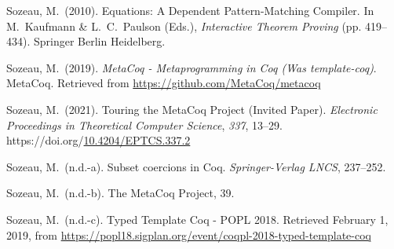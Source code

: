 \documentclass[12pt,twoside]{article}
\begin{document}
{\begin{thebibliography}{1079}
\mdbibitemlabel{}Sozeau, M.~(2010). Equations: A Dependent Pattern-Matching Compiler. In M.~Kaufmann \& L.~C.~Paulson (Eds.), \emph{Interactive Theorem Proving} (pp. 419–434). Springer Berlin Heidelberg.%

\mdbibitemlabel{}Sozeau, M.~(2019). \emph{MetaCoq - Metaprogramming in Coq (Was template-coq)}. MetaCoq. Retrieved from \href{https://github.com/MetaCoq/metacoq}{{\ttfamily https://\hspace{0pt}github.\hspace{0pt}com/\hspace{0pt}MetaCoq/\hspace{0pt}metacoq}}%

\mdbibitemlabel{}Sozeau, M.~(2021). Touring the MetaCoq Project (Invited Paper). \emph{Electronic Proceedings in Theoretical Computer Science}, \emph{337}, 13–29. https://doi.org/\href{https://dx.doi.org/10.4204/EPTCS.337.2}{10.4204/EPTCS.337.2}%

\mdbibitemlabel{}Sozeau, M.~(n.d.-a). Subset coercions in Coq. \emph{Springer-Verlag LNCS}, 237–252.%

\mdbibitemlabel{}Sozeau, M.~(n.d.-b). The MetaCoq Project, 39.%

\mdbibitemlabel{}Sozeau, M.~(n.d.-c). Typed Template Coq - POPL 2018. Retrieved February 1, 2019, from \href{https://popl18.sigplan.org/event/coqpl-2018-typed-template-coq}{{\ttfamily https://\hspace{0pt}popl18.\hspace{0pt}sigplan.\hspace{0pt}org/\hspace{0pt}event/\hspace{0pt}coqpl-\hspace{0pt}2018-\hspace{0pt}typed-\hspace{0pt}template-\hspace{0pt}coq}}%


\end{thebibliography}}
\end{document}
